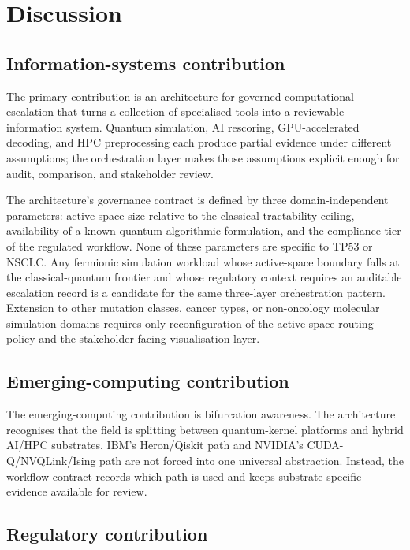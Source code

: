 \documentclass[11pt,letterpaper]{article}
\begin{document}
\section{Discussion}

\subsection{Information-systems contribution}

The primary contribution is an architecture for governed computational escalation that
turns a collection of specialised tools into a reviewable information system.  Quantum
simulation, AI rescoring, GPU-accelerated decoding, and HPC preprocessing each produce
partial evidence under different assumptions; the orchestration layer makes those assumptions
explicit enough for audit, comparison, and stakeholder review.

The architecture's governance contract is defined by three domain-independent parameters:
active-space size relative to the classical tractability ceiling, availability of a known
quantum algorithmic formulation, and the compliance tier of the regulated workflow.  None
of these parameters are specific to TP53 or NSCLC.  Any fermionic simulation workload
whose active-space boundary falls at the classical-quantum frontier and whose regulatory
context requires an auditable escalation record is a candidate for the same three-layer
orchestration pattern.  Extension to other mutation classes, cancer types, or non-oncology
molecular simulation domains requires only reconfiguration of the active-space routing
policy and the stakeholder-facing visualisation layer.

\subsection{Emerging-computing contribution}

The emerging-computing contribution is bifurcation awareness.  The architecture recognises
that the field is splitting between quantum-kernel platforms and hybrid AI/HPC substrates.
IBM's Heron/Qiskit path and NVIDIA's CUDA-Q/NVQLink/Ising path are not forced into one
universal abstraction.  Instead, the workflow contract records which path is used and keeps
substrate-specific evidence available for review.

\subsection{Regulatory contribution}
\end{document}
